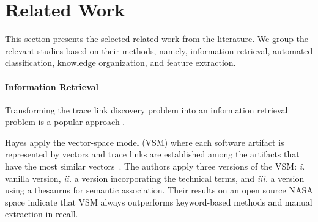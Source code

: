 \section{Related Work}
\label{sec:relwork}

This section presents the selected related work from the literature. We group the relevant studies based on their methods, namely, information retrieval, automated classification, knowledge organization, and feature extraction.


\paragraph{Information Retrieval} Transforming the trace link discovery problem into an information retrieval problem is a popular approach .  %

Hayes \etal{} apply the vector-space model (VSM) where each software artifact is represented by vectors and trace links are established among the artifacts that have the most similar vectors~\cite{hayes-2003}. The authors apply three versions of the VSM: \emph{i.} vanilla version, \emph{ii.} a version incorporating the technical terms, and \emph{iii.} a version using a thesaurus for semantic association. Their results on an open source NASA space indicate that VSM always outperforms keyword-based methods and manual extraction in recall.

